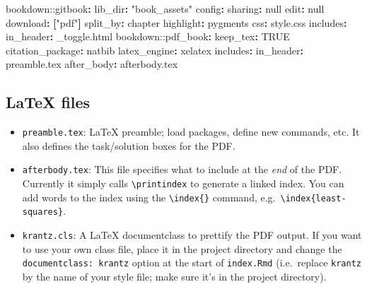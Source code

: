 \documentclass[
  british,
  oneside]{krantz}
\newenvironment{Shaded}{\begin{snugshade}}{\end{snugshade}}
\newcommand{\AttributeTok}[1]{\textcolor[rgb]{0.77,0.63,0.00}{#1}}
\newcommand{\CharTok}[1]{\textcolor[rgb]{0.31,0.60,0.02}{#1}}
\newcommand{\FunctionTok}[1]{\textcolor[rgb]{0.00,0.00,0.00}{#1}}
\newcommand{\KeywordTok}[1]{\textcolor[rgb]{0.13,0.29,0.53}{\textbf{#1}}}
\newcommand{\StringTok}[1]{\textcolor[rgb]{0.31,0.60,0.02}{#1}}
\theoremstyle{definition}
\theoremstyle{definition}
\theoremstyle{definition}
\theoremstyle{definition}
\theoremstyle{remark}
\begin{document}
\begin{Shaded}
\begin{Highlighting}[]
\AttributeTok{bookdown:}\FunctionTok{:gitbook}\KeywordTok{:}
\AttributeTok{  }\FunctionTok{lib\_dir}\KeywordTok{:}\AttributeTok{ }\StringTok{"book\_assets"}
\AttributeTok{  }\FunctionTok{config}\KeywordTok{:}
\AttributeTok{    }\FunctionTok{sharing}\KeywordTok{:}\AttributeTok{ }\CharTok{null}
\AttributeTok{    }\FunctionTok{edit}\KeywordTok{:}\AttributeTok{ }\CharTok{null}
\AttributeTok{    }\FunctionTok{download}\KeywordTok{:}\AttributeTok{ }\KeywordTok{[}\StringTok{"pdf"}\KeywordTok{]}
\AttributeTok{  }\FunctionTok{split\_by}\KeywordTok{:}\AttributeTok{ chapter}
\AttributeTok{  }\FunctionTok{highlight}\KeywordTok{:}\AttributeTok{ pygments}
\AttributeTok{  }\FunctionTok{css}\KeywordTok{:}\AttributeTok{ }\StringTok{\textquotesingle{}style.css\textquotesingle{}}
\AttributeTok{  }\FunctionTok{includes}\KeywordTok{:}
\AttributeTok{    }\FunctionTok{in\_header}\KeywordTok{:}\AttributeTok{ }\StringTok{\textquotesingle{}\_toggle.html\textquotesingle{}}
\AttributeTok{    }
\AttributeTok{bookdown:}\FunctionTok{:pdf\_book}\KeywordTok{:}
\AttributeTok{  }\FunctionTok{keep\_tex}\KeywordTok{:}\AttributeTok{ }\CharTok{TRUE}
\AttributeTok{  }\FunctionTok{citation\_package}\KeywordTok{:}\AttributeTok{ natbib}
\AttributeTok{  }\FunctionTok{latex\_engine}\KeywordTok{:}\AttributeTok{ xelatex}
\AttributeTok{  }\FunctionTok{includes}\KeywordTok{:}
\AttributeTok{    }\FunctionTok{in\_header}\KeywordTok{:}\AttributeTok{ preamble.tex}
\AttributeTok{    }\FunctionTok{after\_body}\KeywordTok{:}\AttributeTok{ afterbody.tex}
\end{Highlighting}
\end{Shaded}

\hypertarget{latex-files}{%
\subsection*{LaTeX files}\label{latex-files}}


\begin{itemize}
\item
  \texttt{preamble.tex}: LaTeX preamble; load packages, define new commands, etc. It also defines the task/solution boxes for the PDF.
\item
  \texttt{afterbody.tex}: This file specifies what to include at the \emph{end} of the PDF. Currently it simply calls \texttt{\textbackslash{}printindex} to generate a linked index.
  You can add words to the index using the \texttt{\textbackslash{}index\{\}} command, e.g.~\texttt{\textbackslash{}index\{least-squares\}}.
\item
  \texttt{krantz.cls}: A LaTeX documentclass to prettify the PDF output. If you want to use your own class file, place it in the project directory and change
  the \texttt{documentclass:\ krantz} option at the start of \texttt{index.Rmd} (i.e.~replace \texttt{krantz} by the name of your style file; make sure it's in the project directory).
\end{itemize}
\end{document}
